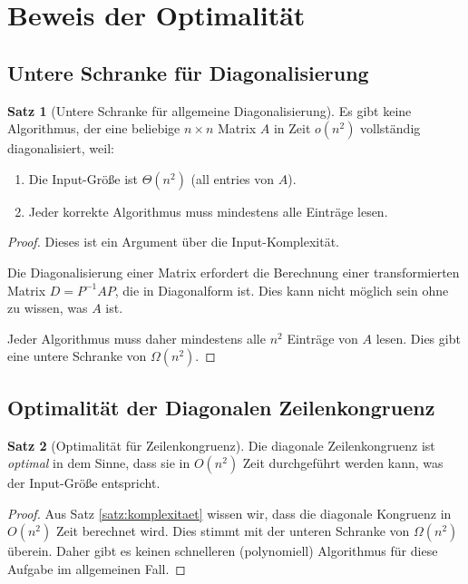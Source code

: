 \documentclass[a4paper,12pt]{article}
\theoremstyle{definition}
\newtheorem{satz}{Satz}
\begin{document}
\section{Beweis der Optimalität}

\subsection{Untere Schranke für Diagonalisierung}

\begin{satz}[Untere Schranke für allgemeine Diagonalisierung]
	\label{satz:untere-schranke}
	Es gibt keine Algorithmus, der eine beliebige $n \times n$ Matrix $A$ in Zeit $o(n^2)$ vollständig diagonalisiert, weil:
	\begin{enumerate}
		\item Die Input-Größe ist $\Theta(n^2)$ (all entries von $A$).
		\item Jeder korrekte Algorithmus muss mindestens alle Einträge lesen.
	\end{enumerate}
\end{satz}

\begin{proof}
	Dieses ist ein Argument über die Input-Komplexität.
	
	Die Diagonalisierung einer Matrix erfordert die Berechnung einer transformierten Matrix $D = P^{-1} A P$, die in Diagonalform ist. Dies kann nicht möglich sein ohne zu wissen, was $A$ ist.
	
	Jeder Algorithmus muss daher mindestens alle $n^2$ Einträge von $A$ lesen. Dies gibt eine untere Schranke von $\Omega(n^2)$.
\end{proof}

\subsection{Optimalität der Diagonalen Zeilenkongruenz}

\begin{satz}[Optimalität für Zeilenkongruenz]
	\label{satz:opt-kongruenz}
	Die diagonale Zeilenkongruenz ist \emph{optimal} in dem Sinne, dass sie in $O(n^2)$ Zeit durchgeführt werden kann, was der Input-Größe entspricht.
\end{satz}

\begin{proof}
	Aus Satz \ref{satz:komplexitaet} wissen wir, dass die diagonale Kongruenz in $O(n^2)$ Zeit berechnet wird. Dies stimmt mit der unteren Schranke von $\Omega(n^2)$ überein. Daher gibt es keinen schnelleren (polynomiell) Algorithmus für diese Aufgabe im allgemeinen Fall.
\end{proof}
\end{document}
